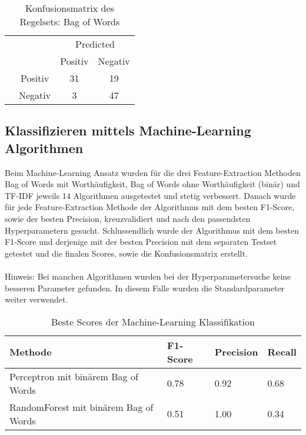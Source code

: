 \begin{table}[H]
	\caption{Konfusionsmatrix des Regelsets: Bag of Words}
	\centering
	\begin{tabular}{@{}cc|cc@{}}
		\multicolumn{1}{c}{} &\multicolumn{1}{c}{} &\multicolumn{2}{c}{Predicted} \\ 
		\multicolumn{1}{c}{} & 
		\multicolumn{1}{c|}{} & 
		\multicolumn{1}{c}{Positiv} & 
		\multicolumn{1}{c}{Negativ} \\ 
		\cline{2-4}
		\multirow[c]{2}{*}{\rotatebox[origin=tr]{90}{Actual}}
		& Positiv  & 31   & 19   \\[1.5ex]
		& Negativ  & 3   & 47 \\ 
		\cline{2-4}
	\end{tabular}
\end{table}

\subsection{Klassifizieren mittels Machine-Learning Algorithmen}
Beim Machine-Learning Ansatz wurden für die drei Feature-Extraction Methoden \glqq Bag of Words mit Worthäufigkeit\grqq{}, \glqq Bag of Words ohne Worthäufigkeit (binär)\grqq{} und \glqq TF-IDF\grqq{}
jeweils 14 Algorithmen ausgetestet und stetig verbessert.
Danach wurde für jede Feature-Extraction Methode der Algorithmus mit dem besten F1-Score, sowie der besten Precision, kreuzvalidiert und nach den passendsten Hyperparametern gesucht.
Schlussendlich wurde der Algorithmus mit dem besten F1-Score und derjenige mit der besten Precision mit dem separaten Testset getestet und die finalen Scores, sowie die Konfusionsmatrix erstellt.
\\\\
Hinweis: Bei manchen Algorithmen wurden bei der Hyperparametersuche keine besseren Parameter gefunden.
In diesem Falle wurden die Standardparameter weiter verwendet.

\begin{table}[H]
	\caption{Beste Scores der Machine-Learning Klassifikation}
	\centering
	\begin{tabular}{|l|l|l|l|}
		\hline
		Methode & F1-Score & Precision & Recall\\
		\hline
		Perceptron mit binärem Bag of Words & 0.78 & 0.92 & 0.68 \\
		RandomForest mit binärem Bag of Words & 0.51 & 1.00 & 0.34 \\
		\hline
	\end{tabular}
\end{table}

